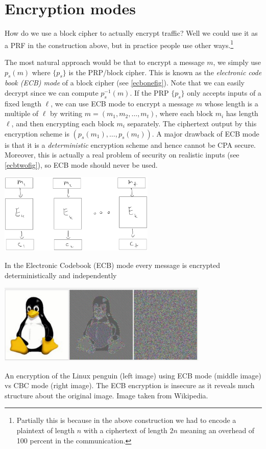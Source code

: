\section{Encryption modes}\label{Encryption-modes}

How do we use a block cipher to actually encrypt traffic? Well we could
use it as a PRF in the construction above, but in practice people use
other ways.\footnote{Partially this is because in the above construction
  we had to encode a plaintext of length \(n\) with a ciphertext of
  length \(2n\) meaning an overhead of 100 percent in the communication.}

The most natural approach would be that to encrypt a message \(m\), we
simply use \(p_s(m)\) where \(\{ p_s \}\) is the PRP/block cipher. This
is known as the \emph{electronic code book (ECB) mode} of a block cipher
(see \cref{ecbonefig}). Note that we can easily decrypt since we can
compute \(p_s^{-1}(m)\). If the PRP \(\{p_s\}\) only accepts inputs of a
fixed length \(\ell\), we can use ECB mode to encrypt a message \(m\)
whose length is a multiple of \(\ell\) by writing
\(m = (m_1, m_2, \ldots, m_t)\), where each block \(m_i\) has length
\(\ell\), and then encrypting each block \(m_i\) separately. The
ciphertext output by this encryption scheme is
\((p_s(m_1), \ldots, p_s(m_t))\). A major drawback of ECB mode is that
it is a \emph{deterministic} encryption scheme and hence cannot be CPA
secure. Moreover, this is actually a real problem of security on
realistic inputs (see \cref{ecbtwofig}), so ECB mode should never be
used.


\begin{marginfigure}
\centering
\includegraphics[width=\linewidth, height=1.5in, keepaspectratio]{../figure/ecb-mode.jpg}
\caption{In the Electronic Codebook (ECB) mode every message is
encrypted deterministically and independently}
\label{ecbonefig}
\end{marginfigure}


\begin{marginfigure}
\centering
\includegraphics[width=\linewidth, height=1.5in, keepaspectratio]{../figure/ECB_prob.jpg}
\caption{An encryption of the Linux penguin (left image) using ECB mode
(middle image) vs CBC mode (right image). The ECB encryption is insecure
as it reveals much structure about the original image. Image taken from
Wikipedia.}
\label{ecbtwofig}
\end{marginfigure}

